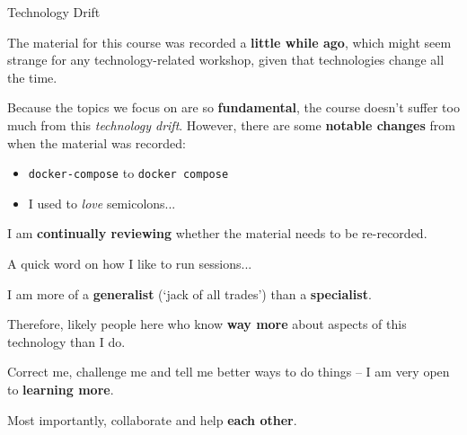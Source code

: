 \documentclass[10pt, dvipsnames, table, aspectratio=169]{beamer}
\begin{document}
\begin{frame}[fragile]{Technology Drift}

The material for this course was recorded a \textbf{little while ago}, which might seem strange for any technology-related workshop, given that technologies change all the time.

Because the topics we focus on are so \textbf{fundamental}, the course doesn't suffer too much from this \emph{technology drift}.
However, there are some \textbf{notable changes} from when the material was recorded:

\begin{itemize}
    \item \texttt{docker-compose} to \texttt{docker compose}
    \item I used to \emph{love} semicolons...
\end{itemize}

I am \textbf{continually reviewing} whether the material needs to be re-recorded.

\end{frame}


\begin{frame}[fragile]{A quick word on how I like to run sessions...}

I am more of a \textbf{generalist} (`jack of all trades') than a \textbf{specialist}.

Therefore, likely people here who know \textbf{way more} about aspects of this technology than I do.

Correct me, challenge me and tell me better ways to do things -- I am very open to \textbf{learning more}.

Most importantly, collaborate and help \textbf{each other}.

\end{frame}

\end{document}
